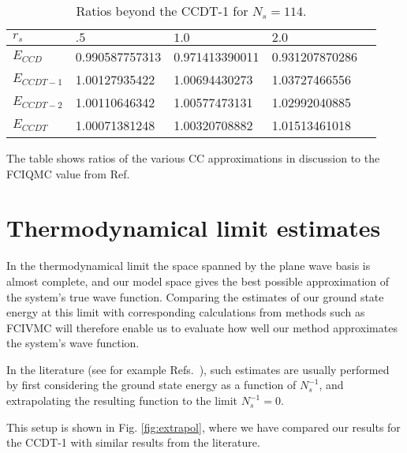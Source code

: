 \begin{table}[h]
\caption{Ratios beyond the CCDT-1 for $N_s = 114$.}
\begin{center}
\begin{threeparttable}
\begin{tabular}{l l l l l}
    \toprule
$r_s$ & $.5$ & $1.0$ & $2.0$ \\ \hline
$E_{CCD} $& 0.990587757313 & 0.971413390011 & 0.931207870286 \\
$E_{CCDT-1}$& 1.00127935422 & 1.00694430273 & 1.03727466556 \\ 
$E_{CCDT-2}$& 1.00110646342 & 1.00577473131 & 1.02992040885 \\
$E_{CCDT}$ & 1.00071381248 & 1.00320708882 & 1.01513461018 \\
\bottomrule
\end{tabular}
\begin{tablenotes}
The table shows ratios of the various CC approximations in discussion to the FCIQMC value from Ref.~\cite{Shepherd2012.}
\end{tablenotes}
\end{threeparttable}
\end{center}
\label{tab:ccdt_2_comparisonII}
\end{table}

\FloatBarrier



\FloatBarrier

\section{Thermodynamical limit estimates}

In the thermodynamical limit the space spanned by the plane wave basis is almost complete, and our model space gives the best possible approximation of the system's true wave function. Comparing the estimates of our ground state energy at this limit with corresponding calculations from methods such as FCIVMC will therefore enable us to evaluate how well our method approximates the system's wave function.

In the literature (see for example Refs.~\cite{Shepherd2012, Shepherd2013, Shepherd2014, Baardsen2014, Roggero2013}), such estimates are usually performed by first considering the ground state energy as a function of $N_{s}^{-1}$, and extrapolating the resulting function to the limit $N_{s}^{-1} = 0$.

This setup is shown in Fig. \ref{fig:extrapol}, where we have compared our results for the CCDT-1 with similar results from the literature. 

